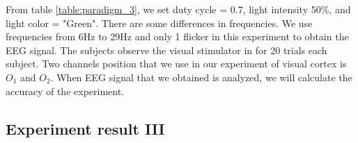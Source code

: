 From table \ref{table:paradigm_3}, we set duty cycle = 0.7, light intensity 50\%, and light color = "Green". There are some differences in frequencies. We use frequencies from 6Hz to 29Hz and only 1 flicker in this experiment to obtain the EEG signal. The subjects observe the visual stimulator in for 20 trials each subject. Two channels position that we use in our experiment of visual cortex is $O_1$ and $O_2$. When EEG signal that we obtained is analyzed, we will calculate the accuracy of the experiment.

\subsection{Experiment result III}

\begin{table}[ht]
\centering
\begin{tabular}{| c | c | c | c |}


\end{tabular}
\end{table}
